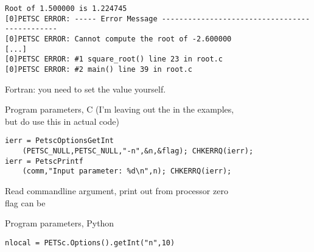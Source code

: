 \begin{details}
\begin{exerciseframe}[root]
\begingroup \tiny
\begin{verbatim}
Root of 1.500000 is 1.224745
[0]PETSC ERROR: ----- Error Message ----------------------------------------------
[0]PETSC ERROR: Cannot compute the root of -2.600000
[...]
[0]PETSC ERROR: #1 square_root() line 23 in root.c
[0]PETSC ERROR: #2 main() line 39 in root.c
\end{verbatim}
\endgroup
Fortran: you need to set the  value yourself.
\end{exerciseframe}

\begin{frame}[containsverbatim]{Program parameters, C}
(I'm leaving out the  in the examples,\\
but do use this in actual code)
\begin{lstlisting}
ierr = PetscOptionsGetInt
    (PETSC_NULL,PETSC_NULL,"-n",&n,&flag); CHKERRQ(ierr);
ierr = PetscPrintf
    (comm,"Input parameter: %d\n",n); CHKERRQ(ierr);
\end{lstlisting}
Read commandline argument, print out from processor zero\\
flag can be 
\end{frame}

\lstset{language=Fortran}
\lstset{language=C}

\end{details}

\lstset{language=Python}
\begin{frame}[containsverbatim]{Program parameters, Python}
\begin{lstlisting}
nlocal = PETSc.Options().getInt("n",10)
\end{lstlisting}
\end{frame}
\lstset{language=C}

\endinput

\frame[containsverbatim]{\frametitle{, C}
\begin{verbatim}
\end{verbatim}
}
\frame[containsverbatim]{\frametitle{, F}
\begin{verbatim}
\end{verbatim}
}
